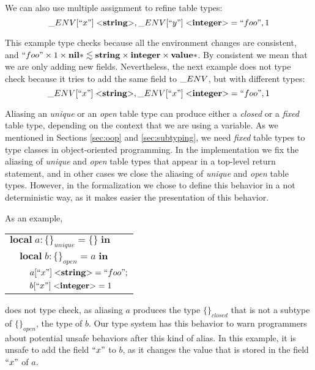 We can also use multiple assignment to refine table types:
\[
\string_ENV[``x"] \; {<}\String{>}, \string_ENV[``y"] \; {<}\Integer{>} = ``foo", 1
\]

This example type checks because all the environment changes are consistent, and
$``foo" \times 1 \times \mathbf{nil}{*} \lesssim \mathbf{string} \times \mathbf{integer} \times \mathbf{value}{*}$.
By consistent we mean that we are only adding new fields.
Nevertheless, the next example does not type check because it tries to add
the same field to $\string_ENV$, but with different types:
\[
\string_ENV[``x"] \; {<}\String{>}, \string_ENV[``x"] \; {<}\Integer{>} = ``foo", 1
\]

Aliasing an \emph{unique} or an \emph{open} table type can produce
either a \emph{closed} or a \emph{fixed} table type, depending on
the context that we are using a variable.
As we mentioned in Sections \ref{sec:oop} and \ref{sec:subtyping},
we need \emph{fixed} table types to type classes in object-oriented programming.
In the implementation we fix the aliasing of \emph{unique} and \emph{open}
table types that appear in a top-level return statement, and in other cases we
close the aliasing of \emph{unique} and \emph{open} table types.
However, in the formalization we chose to define this behavior in
a not deterministic way, as it makes easier the presentation of this behavior.

As an example,
\begin{center}
\begin{tabular}{lll}
\multicolumn{3}{l}{$\mathbf{local} \; a:\{\}_{unique} = \{\} \; \mathbf{in}$}\\
& \multicolumn{2}{l}{$\mathbf{local} \; b:\{\}_{open} = a \; \mathbf{in}$}\\
& & \multicolumn{1}{l}{$a[``x"] \; {<}\mathbf{string}{>} = ``foo";$}\\
& & \multicolumn{1}{l}{$b[``x"] \; {<}\mathbf{integer}{>} = 1$}\\
\end{tabular}
\end{center}
does not type check, as aliasing $a$ produces the type $\{\}_{closed}$
that is not a subtype of $\{\}_{open}$, the type of $b$.
Our type system has this behavior to warn programmers about
potential unsafe behaviors after this kind of alias.
In this example, it is unsafe to add the field $``x"$ to $b$,
as it changes the value that is stored in the field $``x"$ of $a$.

